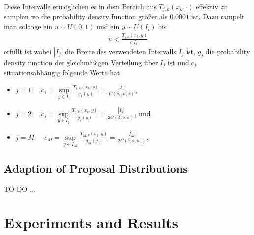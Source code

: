 \documentclass{scrartcl}
\DeclareMathOperator{\sup}{sup}
\begin{document}
    Diese Intervalle ermöglichen es in dem Bereich aus $T_{j,k}(x_k,\cdot)$ effektiv zu samplen wo die probability density function größer als $0.0001$ ist.
    Dazu sampelt man solange ein $u\sim U(0,1)$ und ein $y\sim U(I_i)$ bis
    \begin{align*}
        u < \frac{T_{j,k}(x_k,y)}{c|I_i|}
    \end{align*}
    erfüllt ist wobei $|I_j|$ die Breite des verwendeten Intervalls $I_j$ ist, $g_j$ die probability density function der gleichmäßigen Verteilung über $I_j$ ist und $c_j$ situationsabhängig folgende Werte hat
    \begin{itemize}
        \item $j=1:\quad c_1=\sup\limits_{y\in I_1}\frac{T_{1,k}(x_k,y)}{g_1(y)}=\frac{|I_1|}{C(\delta_1,\sigma,\sigma)}$,
        \item $j=2:\quad c_j=\sup\limits_{y\in I_j}\frac{T_{j,k}(x_k,y)}{g_j(y)}=\frac{|I_j|}{2C(\delta,\sigma,\sigma)}$, und
        \item $j=M:\quad c_M=\sup\limits_{y\in I_M}\frac{T_{M,k}(x_k,y)}{g_M(y)}=\frac{|I_M|}{2C(\delta,\sigma,\sigma_0)}$.
    \end{itemize}


    \subsection{Adaption of Proposal Distributions}
    TO DO ...


    \section{Experiments and Results}
\end{document}
